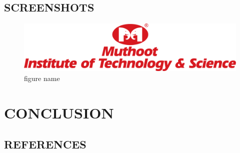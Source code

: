 \documentclass[a4paper,12pt]{report}
\begin{document}
\newpage

\section{SCREENSHOTS}



\begin{figure}[hbtp]
    \centering
    \includegraphics{images/MITS.png}
    \caption{figure name}
    \label{fig1}
\end{figure}

\chapter{CONCLUSION}

\newpage

\section{REFERENCES}
\end{document}
